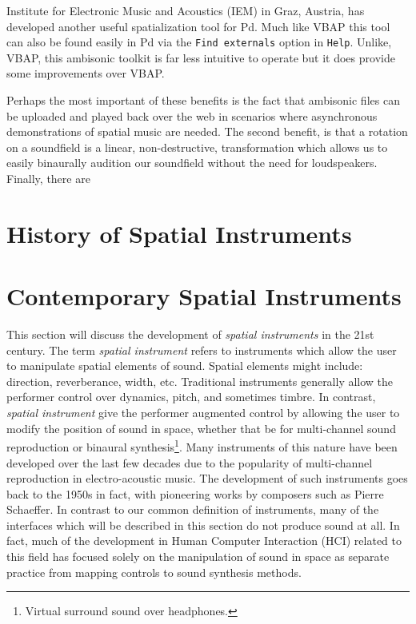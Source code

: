 Institute for Electronic Music and Acoustics (IEM) in Graz, Austria, has developed another useful spatialization tool for Pd. Much like VBAP this tool can also be found easily in Pd via the \texttt{Find externals} option in \texttt{Help}. Unlike, VBAP, this ambisonic toolkit is far less intuitive to operate but it does provide some improvements over VBAP. 

Perhaps the most important of these benefits is the fact that ambisonic files can be uploaded and played back over the web in scenarios where asynchronous demonstrations of spatial music are needed. The second benefit, is that a rotation on a soundfield is a linear, non-destructive, transformation which allows us to easily binaurally audition our soundfield without the need for loudspeakers. Finally, there are


\section{History of Spatial Instruments} \label{sec:spat_instruments}
\section{Contemporary Spatial Instruments}

This section will discuss the development of \textit{spatial instruments} in the 21st century. The term \textit{spatial instrument} refers to instruments which allow the user to manipulate spatial elements of sound. Spatial elements might include: direction, reverberance, width, etc. Traditional instruments generally allow the performer control over dynamics, pitch, and sometimes timbre. In contrast, \textit{spatial instrument} give the performer augmented control by allowing the user to modify the position of sound in space, whether that be for multi-channel sound reproduction or binaural synthesis\footnote{Virtual surround sound over headphones.}. 
Many instruments of this nature have been developed over the last few decades due to the popularity of multi-channel reproduction in electro-acoustic music. The development of such instruments goes back to the 1950s in fact, with pioneering works by composers such as Pierre Schaeffer. In contrast to our common definition of instruments, many of the interfaces which will be described in this section do not produce sound at all. In fact, much of the development in Human Computer Interaction (HCI) related to this field has focused solely on the manipulation of sound in space as separate practice from mapping controls to sound synthesis methods.  

